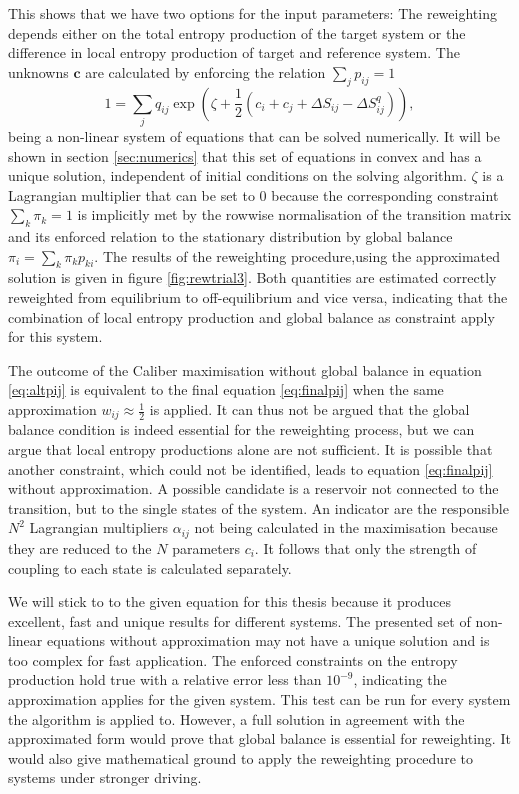 This shows that we have two options for the input parameters: The reweighting depends either on the total entropy production of the target system or the difference in local entropy production of target and reference system. 
The unknowns $\bm{c}$ are calculated by enforcing the relation 
$\sum_j p_{ij} =1 $
    \begin{equation}
      1 = \sum_j q_{ij} \exp \left ( \zeta+ \frac{1}{2} \left ( c_i + c_j + \Delta 
S_{ij} - \Delta S_{ij}^q \right ) \right ),
      \label{eq:iteration}
    \end{equation}
being a non-linear system of equations that can be solved numerically. It will be shown in section \ref{sec:numerics} that this set of equations in convex and has a unique solution, independent of initial conditions on the solving algorithm. $\zeta$ is a Lagrangian multiplier that can be set to $0$ because the corresponding constraint $\sum_k \pi_k = 1$ is implicitly met by the rowwise normalisation of the transition matrix and 
its enforced relation to the stationary distribution by global balance 
$\pi_i = \sum_k \pi_k p_{ki}$.  The results of the reweighting procedure,using the approximated solution is given in figure \ref{fig:rewtrial3}. Both quantities are estimated correctly reweighted from equilibrium to off-equilibrium and vice versa, indicating that the combination of local entropy production and global balance as constraint apply for this system. 

The outcome of the Caliber maximisation without global balance in equation \ref{eq:altpij} is equivalent to the final equation \ref{eq:finalpij} when the same approximation $w_{ij} \approx \frac{1}{2}$ is applied. It  can thus not be argued that the global balance condition is indeed essential for the reweighting process, but we can argue that local entropy productions alone are not sufficient. It is possible that another constraint, which could not be identified, leads to equation \ref{eq:finalpij} without approximation. A possible candidate is a reservoir not connected to the transition, but to the single states of the system. An indicator are the responsible $N^2$ Lagrangian multipliers $\alpha_{ij}$ not being calculated in the maximisation because they are reduced to the $N$ parameters $c_i$. It follows that only the strength of coupling to each state is calculated separately.

We will stick to to the given equation for this thesis because it produces excellent, fast and unique results for different systems. The presented set of non-linear equations without approximation may not have a unique solution and is too complex for fast application. The  enforced constraints on the entropy production hold true with a relative error less than $ 10^{-9}$, 
indicating the approximation applies for the given system. This test can be run for every system the algorithm is applied to.  However, a full solution in agreement with the approximated form would prove that global balance is essential for reweighting. It would also give mathematical ground to apply the reweighting procedure to systems under stronger driving.  


